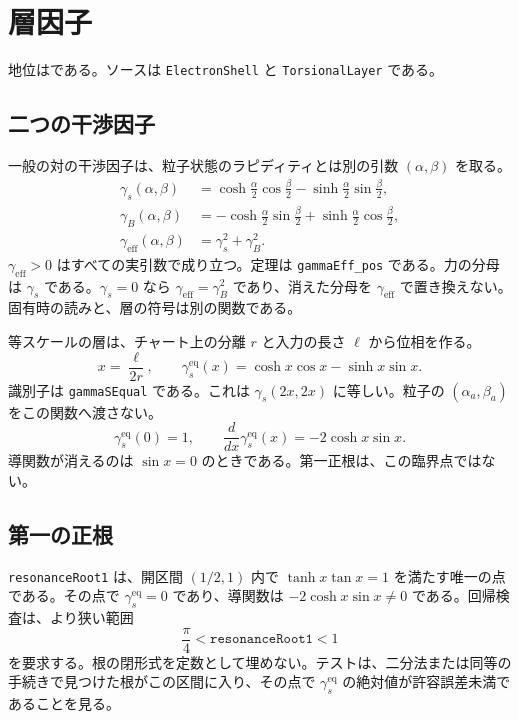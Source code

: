 \section{層因子}
\label{sec:layer}

地位は\dstrec{}である。ソースは \texttt{ElectronShell} と \texttt{TorsionalLayer} である。

\subsection{二つの干渉因子}

一般の対の干渉因子は、粒子状態のラピディティとは別の引数 \((\alpha,\beta)\) を取る。
\begin{align}
\gamma_s(\alpha,\beta)
&=\cosh\frac\alpha2\cos\frac\beta2-\sinh\frac\alpha2\sin\frac\beta2,\\
\gamma_B(\alpha,\beta)
&=-\cosh\frac\alpha2\sin\frac\beta2+\sinh\frac\alpha2\cos\frac\beta2,\\
\gamma_{\mathrm{eff}}(\alpha,\beta)
&=\gamma_s^2+\gamma_B^2.
\end{align}
\(\gamma_{\mathrm{eff}}>0\) はすべての実引数で成り立つ。定理は \texttt{gammaEff\_pos} である。力の分母は \(\gamma_s\) である。\(\gamma_s=0\) なら \(\gamma_{\mathrm{eff}}=\gamma_B^2\) であり、消えた分母を \(\gamma_{\mathrm{eff}}\) で置き換えない。固有時の読みと、層の符号は別の関数である。

等スケールの層は、チャート上の分離 \(r\) と入力の長さ \(\ell\) から位相を作る。
\[
x=\frac{\ell}{2r},\qquad
\gamma_s^{\mathrm{eq}}(x)=\cosh x\cos x-\sinh x\sin x.
\]
識別子は \texttt{gammaSEqual} である。これは \(\gamma_s(2x,2x)\) に等しい。粒子の \((\alpha_a,\beta_a)\) をこの関数へ渡さない。
\[
\gamma_s^{\mathrm{eq}}(0)=1,\qquad
\frac{d}{dx}\gamma_s^{\mathrm{eq}}(x)=-2\cosh x\sin x.
\]
導関数が消えるのは \(\sin x=0\) のときである。第一正根は、この臨界点ではない。

\subsection{第一の正根}

\texttt{resonanceRoot1} は、開区間 \((1/2,1)\) 内で \(\tanh x\tan x=1\) を満たす唯一の点である。その点で \(\gamma_s^{\mathrm{eq}}=0\) であり、導関数は \(-2\cosh x\sin x\neq 0\) である。回帰検査は、より狭い範囲
\[
\frac\pi4<\texttt{resonanceRoot1}<1
\]
を要求する。根の閉形式を定数として埋めない。テストは、二分法または同等の手続きで見つけた根がこの区間に入り、その点で \(\gamma_s^{\mathrm{eq}}\) の絶対値が許容誤差未満であることを見る。

